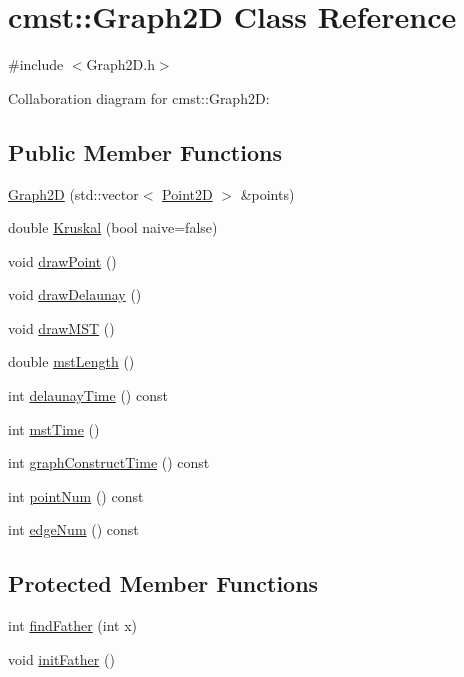 \hypertarget{classcmst_1_1_graph2_d}{}\section{cmst\+:\+:Graph2D Class Reference}
\label{classcmst_1_1_graph2_d}


{\ttfamily \#include $<$Graph2\+D.\+h$>$}



Collaboration diagram for cmst\+:\+:Graph2D\+:
\subsection*{Public Member Functions}
\begin{DoxyCompactItemize}
\item 
\hyperlink{classcmst_1_1_graph2_d_a36cf583f9e2e59da2bed94c8569914d2}{Graph2D} (std\+::vector$<$ \hyperlink{classcmst_1_1_point2_d}{Point2D} $>$ \&points)
\item 
double \hyperlink{classcmst_1_1_graph2_d_ac3ce0434f4c42c2ed2b7c7861b32710f}{Kruskal} (bool naive=false)
\item 
void \hyperlink{classcmst_1_1_graph2_d_affec250ee22a067a28127b46ce976b90}{draw\+Point} ()
\item 
void \hyperlink{classcmst_1_1_graph2_d_a2c4ed2ccd1fffc94c636929e531c4e3e}{draw\+Delaunay} ()
\item 
void \hyperlink{classcmst_1_1_graph2_d_a96e388b819b351c8564eed9aecf58f7d}{draw\+M\+ST} ()
\item 
double \hyperlink{classcmst_1_1_graph2_d_aea22c23fdbb3b9e91671562cb19730ed}{mst\+Length} ()
\item 
int \hyperlink{classcmst_1_1_graph2_d_a93a1d4d5d2dd08796e37bcba6de79341}{delaunay\+Time} () const 
\item 
int \hyperlink{classcmst_1_1_graph2_d_a3b596946f310f7024036d2c6a18985a3}{mst\+Time} ()
\item 
int \hyperlink{classcmst_1_1_graph2_d_ad4756aa3f617493bd8b3f6ecfe099449}{graph\+Construct\+Time} () const 
\item 
int \hyperlink{classcmst_1_1_graph2_d_a0b18b38d5813b2fdbe8f5a8d6f92575d}{point\+Num} () const 
\item 
int \hyperlink{classcmst_1_1_graph2_d_ae2474e4dd9964cd18fc9926a296c82fd}{edge\+Num} () const 
\end{DoxyCompactItemize}
\subsection*{Protected Member Functions}
\begin{DoxyCompactItemize}
\item 
int \hyperlink{classcmst_1_1_graph2_d_a0b860daa24f288eea5f490e12fcb67e2}{find\+Father} (int x)
\item 
void \hyperlink{classcmst_1_1_graph2_d_a5de76dfe02b4a13e0d3fe9a5e7ea7285}{init\+Father} ()
\end{DoxyCompactItemize}
